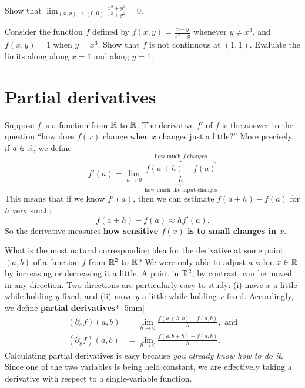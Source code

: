\documentclass[svgnames]{watsonbook}
\begin{document}
  \begin{exercise}{}{}
    Show that $\displaystyle{\lim_{(x,y) \to (0,0)} \frac{x^3 + y^3}{x^2 + y^2}} =
    0$. 
  \end{exercise}

  \begin{exercise}{}{}
    Consider the function $f$ defined by $f(x,y) = \frac{x-y}{x^3-y}$
    whenever $y \neq x^3$, and $f(x,y) = 1$ when $y = x^3$. Show that
    $f$ is not continuous at $(1,1)$. Evaluate the limits along along
    $x=1$ and along $y=1$.
  \end{exercise}

  \section{Partial derivatives} \label{sec:partial}



  Suppose $f$ is a function from $\mathbb{R}$ to $\mathbb{R}$. The derivative $f'$ of
  $f$ is the answer to the question ``how does $f(x)$ change when $x$
  changes just a little?'' More precisely, if $a\in \mathbb{R}$, we define
  \[
    f'(a) = \lim_{h \to 0} \frac{\overbrace{f(a+h)-f(a)}^{\text{how
          much $f$ changes}}}{\underbrace{h}_{\text{how much the input
          changes}}}
  \]
  This means that if we know $f'(a)$, then we can estimate
  $f(a+h) - f(a)$ for $h$ very small:
  \[
    f(a+h) - f(a) \approx h
    f'(a). 
  \]
  So the derivative measures \textbf{how sensitive $f(x)$ is to small
    changes in $x$}.
  
  What is the most natural corresponding idea for the derivative at
  some point $(a,b)$ of a function $f$ from $\mathbb{R}^2$ to $\mathbb{R}$? We were
  only able to adjust a value $x\in \mathbb{R}$ by increasing or decreasing it
  a little. A point in $\mathbb{R}^2$, by contrast, can be moved in any
  direction. Two directions are particularly easy to study: (i) move
  $x$ a little while holding $y$ fixed, and (ii) move $y$ a little
  while holding $x$ fixed. Accordingly, we define \textbf{partial
    derivatives}* [5mm]
  \begin{align*}
    (\partial_x f)(a,b) &= \lim_{h \to 0}\frac{f(a+h,b) - f(a,b)}{h},
                          \text{ and} \\
    (\partial_y f)(a,b) &= \lim_{h \to 0}\frac{f(a,b+h) - f(a,b)}{h}. 
  \end{align*}
  Calculating partial derivatives is easy because \textit{you already
    know how to do it}. Since one of the two variables is being held
  constant, we are effectively taking a derivative with respect to a
  single-variable function.
\end{document}
